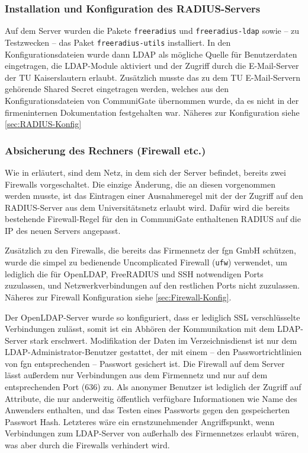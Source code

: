 \documentclass[11pt,a4paper,titlepage=firstiscover,headsepline,bibtotoc]{scrartcl} %
\begin{document}
\subsubsection{Installation und Konfiguration des RADIUS-Servers}\label{sec:RADIUS-Konf}
Auf dem Server wurden die Pakete \texttt{freeradius} und \texttt{freeradius-ldap} sowie -- zu Testzwecken -- das Paket \texttt{freeradius-utils} installiert. In den Konfigurationsdateien wurde dann LDAP als mögliche Quelle für Benutzerdaten eingetragen, die LDAP-Module aktiviert und der Zugriff durch die E-Mail-Server der TU Kaiserslautern erlaubt. Zusätzlich musste das zu dem TU E-Mail-Servern gehörende Shared Secret eingetragen werden, welches aus den Konfigurationsdateien von CommuniGate übernommen wurde, da es nicht in der firmeninternen Dokumentation festgehalten war. Näheres zur Konfiguration siehe \autoref{sec:RADIUS-Konfig}

\subsubsection{Absicherung des Rechners (Firewall etc.)}
Wie in  erläutert, sind dem Netz, in dem sich der Server befindet, bereits zwei Firewalls vorgeschaltet. Die einzige Änderung, die an diesen vorgenommen werden musste, ist das Eintragen einer Ausnahmeregel mit der der Zugriff auf den RADIUS-Server aus dem Universitätsnetz erlaubt wird. Dafür wird die bereits bestehende Firewall-Regel für den in CommuniGate enthaltenen RADIUS auf die IP des neuen Servers angepasst.

Zusätzlich zu den Firewalls, die bereits das Firmennetz der fgn GmbH schützen, wurde die simpel zu bedienende Uncomplicated Firewall (\texttt{ufw}) verwendet, um lediglich die für OpenLDAP, FreeRADIUS und SSH notwendigen Ports zuzulassen, und Netzwerkverbindungen auf den restlichen Ports nicht zuzulassen. Näheres zur Firewall Konfiguration siehe \autoref{sec:Firewall-Konfig}.

Der OpenLDAP-Server wurde so konfiguriert, dass er lediglich SSL verschlüsselte Verbindungen zulässt, somit ist ein Abhören der Kommunikation mit dem LDAP-Server stark erschwert. Modifikation der Daten im Verzeichnisdienst ist nur dem LDAP-Administrator-Benutzer gestattet, der mit einem -- den Passwortrichtlinien von fgn entsprechenden -- Passwort gesichert ist. Die Firewall auf dem Server lässt außerdem nur Verbindungen aus dem Firmennetz und nur auf dem entsprechenden Port (636) zu. Als anonymer Benutzer ist lediglich der Zugriff auf Attribute, die nur anderweitig öffentlich verfügbare Informationen wie Name des Anwenders enthalten, und das Testen eines Passworts gegen den gespeicherten Passwort Hash. Letzteres wäre ein ernstzunehmender Angriffspunkt, wenn Verbindungen zum LDAP-Server von außerhalb des Firmennetzes erlaubt wären, was aber durch die Firewalls verhindert wird.
\end{document}
